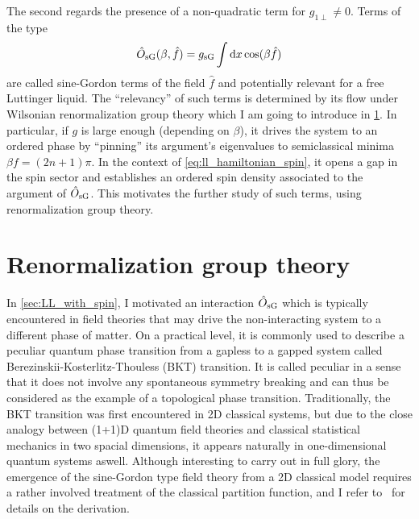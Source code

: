 The second regards the presence of a non-quadratic term for $g_{1\perp}\neq0$.
Terms of the type
\begin{align}
    \hat O_{\rm sG}(\beta,\hat f) = g_{\rm sG}\int\mathrm d x\cos(\beta\hat f)
\end{align}
are called sine-Gordon terms of the field $\hat f$ and potentially relevant for a free Luttinger liquid.
The ``relevancy'' of such terms is determined by its flow under Wilsonian renormalization group theory which I am going to introduce in \cref{sec:renormalization_group_theory}.
In particular, if $g$ is large enough (depending on $\beta$), it drives the system to an ordered phase by ``pinning'' its argument's eigenvalues to semiclassical minima $\beta f=(2n+1)\pi$.
In the context of \cref{eq:ll_hamiltonian_spin}, it opens a gap in the spin sector and establishes an ordered spin density associated to the argument of $\hat O_{\rm sG}$.
This motivates the further study of such terms, using renormalization group theory.

%
%
\section{Renormalization group theory}
\label{sec:renormalization_group_theory}
In \cref{sec:LL_with_spin}, I motivated an interaction $\hat O_{\rm sG}$ which is typically encountered in field theories that may drive the non-interacting system to a different phase of matter.
On a practical level, it is commonly used to describe a peculiar quantum phase transition from a gapless to a gapped system called Berezinskii-Kosterlitz-Thouless (BKT) transition.
It is called peculiar in a sense that it does not involve any spontaneous symmetry breaking and can thus be considered as the example of a topological phase transition.
Traditionally, the BKT transition was first encountered in 2D classical systems, but due to the close analogy between (1+1)D quantum field theories and classical statistical mechanics in two spacial dimensions, it appears naturally in one-dimensional quantum systems aswell.
Although interesting to carry out in full glory, the emergence of the sine-Gordon type field theory from a 2D classical model requires a rather involved treatment of the classical partition function, and I refer to~\cite{AltlandSimons2010} for details on the derivation.

